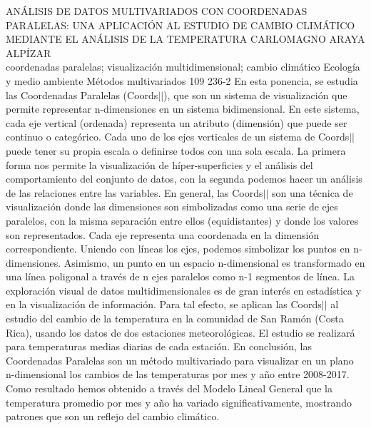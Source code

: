 \A
{ANÁLISIS DE DATOS MULTIVARIADOS CON COORDENADAS PARALELAS: UNA APLICACIÓN AL ESTUDIO DE CAMBIO CLIMÁTICO MEDIANTE EL ANÁLISIS DE LA TEMPERATURA}
{CARLOMAGNO ARAYA ALPÍZAR}
{
\\
}
{coordenadas paralelas; visualización multidimensional; cambio climático} 
 {Ecología y medio ambiente} 
 {Métodos multivariados} 
 {109} 
 {236-2}
{En esta ponencia, se estudia las Coordenadas Paralelas (Coords$||$), que son un sistema de visualización que permite representar n-dimensiones en un sistema bidimensional. En este sistema, cada eje vertical (ordenada) representa un atributo (dimensión) que puede ser continuo o categórico. Cada uno de los ejes verticales de un sistema de Coords$||$ puede tener su propia escala o definirse todos con una sola escala. La primera forma nos permite la visualización de híper-superficies y el análisis del comportamiento del conjunto de datos, con la segunda podemos hacer un análisis de las relaciones entre las variables. En general, las Coords$||$ son una técnica de visualización donde las dimensiones son simbolizadas como una serie de ejes paralelos, con la misma separación entre ellos (equidistantes) y donde los valores son representados. Cada eje representa una coordenada en la dimensión correspondiente. Uniendo con líneas los ejes, podemos simbolizar los puntos en n-dimensiones. Asimismo, un punto en un espacio n-dimensional es transformado en una línea poligonal a través de n ejes paralelos como n-1 segmentos de línea. La exploración visual de datos multidimensionales es de gran interés en estadística y en la visualización de información. Para tal efecto, se aplican las Coords$||$ al estudio del cambio de la temperatura en la comunidad de San Ramón (Costa Rica), usando los datos de dos estaciones meteorológicas. El estudio se realizará para temperaturas medias diarias de cada estación. En conclusión, las Coordenadas Paralelas son un método multivariado para visualizar en un plano n-dimensional los cambios de las temperaturas por mes y año entre 2008-2017. Como resultado hemos obtenido a través del Modelo Lineal General que la temperatura promedio por mes y año ha variado significativamente, mostrando patrones que son un reflejo del cambio climático. }
